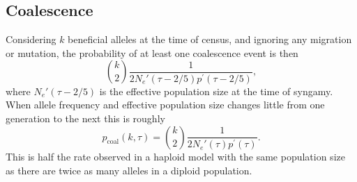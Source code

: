 \documentclass[]{article}
\begin{document}
\subsection*{Coalescence}
%
Considering $k$ beneficial alleles at the time of census, and ignoring any migration or mutation, the probability of at least one coalescence event is then 
\begin{equation}
\binom{k}{2}\frac{1}{2N_e'(\tau-2/5)p^\prime(\tau-2/5)},
\end{equation}
where $N_e'(\tau-2/5)$ is the effective population size at the time of syngamy.
When allele frequency and effective population size changes little from one generation to the next this is roughly
\begin{equation}
p_\mathrm{coal}(k,\tau) = \binom{k}{2}\frac{1}{2N_e'(\tau)p^\prime(\tau)}.
\end{equation}
This is half the rate observed in a haploid model with the same population size \citep[equation 5 in][]{pennings2006soft2} as there are twice as many alleles in a diploid population.
%
\end{document}

